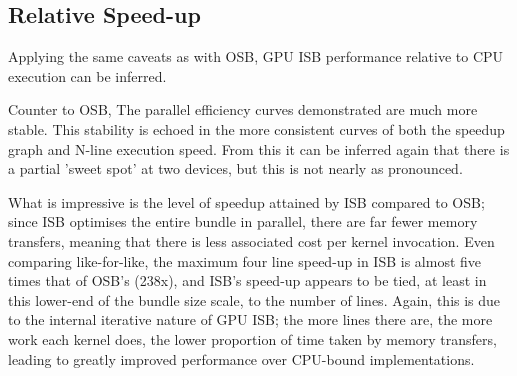 \subsection{Relative Speed-up}
Applying the same caveats as with OSB, GPU ISB performance relative to CPU execution can be inferred. 
\begin{figure}[h!]
\centering
{}
\end{figure}
Counter to OSB, The parallel efficiency curves demonstrated are much more stable. This stability is echoed in the more consistent curves of both the speedup graph and N-line execution speed. From this it can be inferred again that there is a partial 'sweet spot' at two devices, but this is not nearly as pronounced.

What is impressive is the level of speedup attained by ISB compared to OSB; since ISB optimises the entire bundle in parallel, there are far fewer memory transfers, meaning that there is less associated cost per kernel invocation. Even comparing like-for-like, the maximum four line speed-up in ISB is almost five times that of OSB's (238x), and ISB's speed-up appears to be tied, at least in this lower-end of the bundle size scale, to the number of lines. Again, this is due to the internal iterative nature of GPU ISB; the more lines there are, the more work each kernel does, the lower proportion of time taken by memory transfers, leading to greatly improved performance over CPU-bound implementations.

